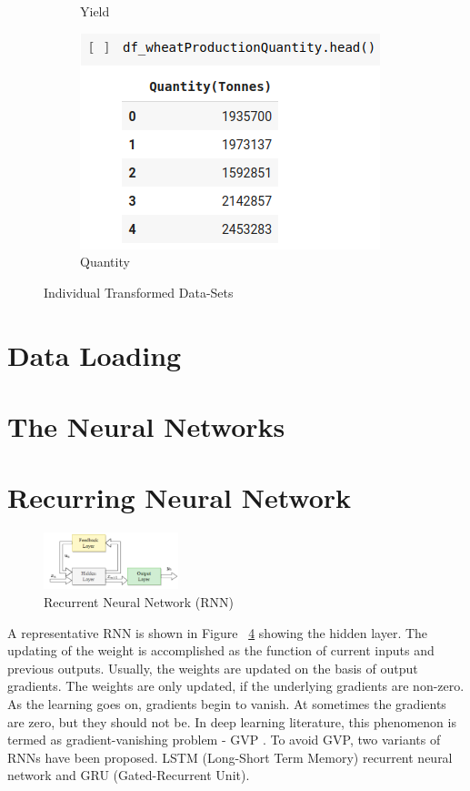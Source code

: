 \begin{figure}
\begin{subfigure}{.25\textwidth}
		\caption{Yield}
		\label{fig:sub3}
	\end{subfigure}
	\begin{subfigure}{.24\textwidth}
		\centering
		\includegraphics[width=.4\linewidth]{fig/quantityTonnes.png}
		\caption{Quantity}
		\label{fig:sub4}
	\end{subfigure}

	\caption{Individual Transformed Data-Sets}
	\label{fig:heads}
\end{figure}



\section{Data Loading}
\section{The Neural Networks}
\section{Recurring Neural Network}
\begin{figure}[h!]
	\centering
	\includegraphics[width=0.35\textwidth]{fig/rnn.png}
	\caption{Recurrent Neural Network (RNN)}
	\label{fig:rnn}
\end{figure}
A representative RNN is shown in Figure ~\ref{fig:rnn} showing the hidden layer. The updating of the weight is accomplished as the function of current inputs and previous outputs. Usually, the weights are updated on the basis of output gradients. The weights are only updated, if the underlying gradients are non-zero. As the learning goes on, gradients begin to vanish. At sometimes the gradients are zero, but they should not be. In deep learning literature, this phenomenon is termed as gradient-vanishing problem - GVP \cite{haykin2009neural}. To avoid GVP, two variants of RNNs have been proposed. LSTM (Long-Short Term Memory) recurrent neural network and GRU (Gated-Recurrent Unit).

